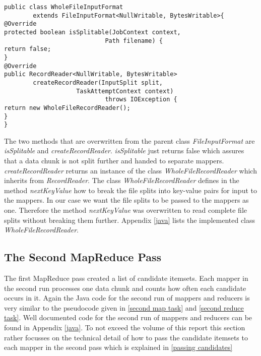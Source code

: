 \begin{lstlisting}[caption={InputFormatClass to pass complete data chunk content to mappers},captionpos=b,label={lst:passing complete}]
public class WholeFileInputFormat 
		extends FileInputFormat<NullWritable, BytesWritable>{	
@Override
protected boolean isSplitable(JobContext context, 
							Path filename) {        
return false;
}
@Override
public RecordReader<NullWritable, BytesWritable>
		createRecordReader(InputSplit split, 
					TaskAttemptContext context)
 						 	throws IOException {   	
return new WholeFileRecordReader();       
}   
}
\end{lstlisting}

The two methods that are overwritten from the parent class \textit{FileInputFormat} are \textit{isSplitable} and \textit{createRecordReader}. \textit{isSplitable} just returns false which assures that a data chunk is not split further and handed to separate mappers. \textit{createRecordReader} returns an instance of the class \textit{WholeFileRecordReader} which inherits from \textit{RecordReader}. The class \textit{WholeFileRecordReader} defines in the method \textit{nextKeyValue} how to break the file splits into key-value pairs for input to the mappers. In our case we want the file splits to be passed to the mappers as one. Therefore the method \textit{nextKeyValue} was overwritten to read complete file splits without breaking them further. Appendix \ref{java} lists the implemented class \textit{WholeFileRecordReader}.
\subsection{The Second MapReduce Pass}\label{second pass details}

The first MapReduce pass created a list of candidate itemsets. Each mapper in the second run processes one data chunk and counts how often each candidate occurs in it. Again the Java code for the second run of mappers and reducers is very similar to the pseudocode given in \ref{second map task} and \ref{second reduce task}. Well documented code for the second run of mappers and reducers can be found in Appendix \ref{java}. To not exceed the volume of this report this section rather focusses on the technical detail of how to pass the candidate itemsets to each mapper in the second pass which is explained in \ref{passing candidates}
